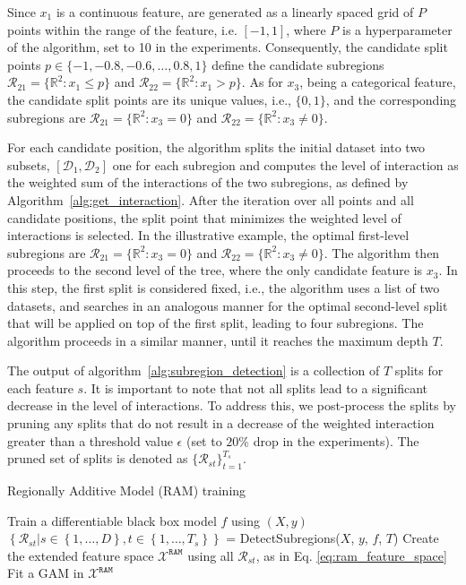 \documentclass[12pt]{article}
\newcommand{\xb}{\mathbf{x}}
\newcommand{\Xcal}{\mathcal{X}}
\begin{document}
Since $x_1$ is a continuous feature, are generated as a linearly spaced grid of $P$ points within the range of the feature, i.e. $[-1, 1]$,
where $P$ is a hyperparameter of the algorithm, set to 10 in the experiments.
Consequently, the candidate split points $p \in \{-1, -0.8, -0.6, \ldots, 0.8, 1\}$ define the candidate subregions
$\mathcal{R}_{21} = \{ \mathbb{R}^2 : x_1 \leq p \}$ and $\mathcal{R}_{22} = \{ \mathbb{R}^2 : x_1 > p \}$.
As for $x_3$, being a categorical feature, the candidate split points are its unique values, i.e., $\{0, 1\}$,
and the corresponding subregions are $\mathcal{R}_{21} = \{ \mathbb{R}^2 : x_3 = 0 \}$ and $\mathcal{R}_{22} = \{ \mathbb{R}^2 : x_3 \neq 0 \}$.

For each candidate position, the algorithm splits the initial dataset into two subsets,
$[\mathcal{D}_1, \mathcal{D}_2]$ one for each subregion and computes the level of interaction
as the weighted sum of the interactions of the two subregions, as defined by Algorithm~\ref{alg:get_interaction}.
After the iteration over all points and all candidate positions,
the split point that minimizes the weighted level of interactions is selected.
In the illustrative example, the optimal first-level subregions are
$\mathcal{R}_{21} = \{ \mathbb{R}^2 : x_3 = 0 \}$ and $\mathcal{R}_{22} = \{ \mathbb{R}^2 : x_3 \neq 0 \}$.
The algorithm then proceeds to the second level of the tree, where the only candidate feature is $x_3$.
In this step, the first split is considered fixed, i.e., the algorithm uses a list of two datasets,
and searches in an analogous manner for the optimal second-level split that will be applied on top of the first split,
leading to four subregions.
The algorithm proceeds in a similar manner, until it reaches the maximum depth $T$.

The output of algorithm~\ref{alg:subregion_detection} is a collection of $T$ splits for each feature $s$.
It is important to note that not all splits lead to a significant decrease in the level of interactions.
To address this, we post-process the splits by pruning any splits that do not result in a decrease of the
weighted interaction greater than a threshold value $\epsilon$ (set to $20\%$ drop in the experiments).
The pruned set of splits is denoted as $\{\mathcal{R}_{st}\}_{t=1}^{T_s}$.


\begin{algorithm}
\caption{Regionally Additive Model (RAM) training}
\label{alg:ram}
\SetAlgoLined
{}
\BlankLine
{}
  \BlankLine
  Train a differentiable black box model $f$ using $(X, y)$\;
  $\left\{\mathcal{R}_{st}|s\in\left\{1,\ldots,D\right\},
  t\in\left\{1,\ldots,T_s\right\}\right\}$ = DetectSubregions($X$, $y$, $f$, $T$)\;
  Create the extended feature space $\mathcal{X}^{\mathtt{RAM}}$ using all
  $\mathcal{R}_{st}$, as in Eq. \eqref{eq:ram_feature_space} \;
  Fit a GAM in $\mathcal{X}^{\mathtt{RAM}}$ 
  \Return{$f^{\mathtt{RAM}}(\xb) = c + \sum_{s,t} f_{st}(x_{st}), \quad \xb \in \Xcal^{\mathtt{RAM}}$}
\end{algorithm}
\end{document}

